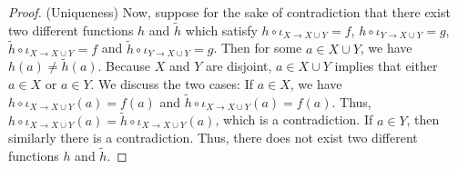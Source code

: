 \begin{enumerate}
\begin{proof}
        (Uniqueness) Now, suppose for the sake of contradiction that there exist two different functions $h$ and $\tilde{h}$ which satisfy $h\circ \iota_{X\to X\cup Y}=f$, $h\circ \iota_{Y\to X\cup Y}=g$, $\tilde{h}\circ \iota_{X\to X\cup Y}=f$ and $\tilde{h}\circ \iota_{Y\to X\cup Y}=g$. Then for some $a\in X\cup Y$, we have $h(a)\neq\tilde{h}(a)$. Because $X$ and $Y$ are disjoint, $a\in X\cup Y$ implies that either $a\in X$ or $a\in Y$. We discuss the two cases: If $a\in X$, we have $h\circ \iota_{X\to X\cup Y}(a)=f(a)$ and $\tilde{h}\circ \iota_{X\to X\cup Y}(a)=f(a)$. Thus, $h\circ \iota_{X\to X\cup Y}(a)=\tilde{h}\circ \iota_{X\to X\cup Y}(a)$, which is a contradiction. If $a\in Y$, then similarly there is a contradiction. Thus, there does not exist two different functions $h$ and $\tilde{h}$.
    \end{proof}
\end{enumerate}
